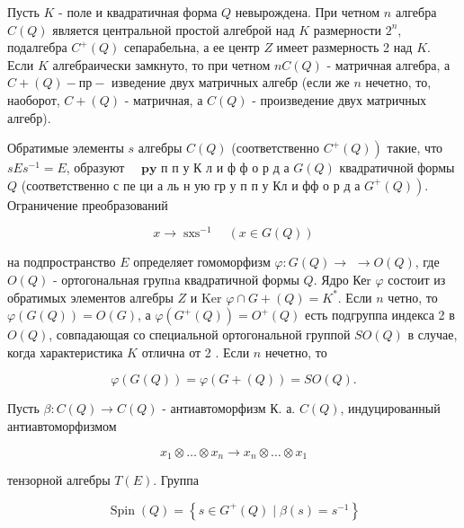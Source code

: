 \documentclass[10pt]{article}
\begin{document}
Пусть $K$ - поле и квадратичная форма $Q$ невырождена. При четном $n$ алгебра $C(Q)$ является центральной простой алгеброй над $K$ размерности $2^{n}$, подалгебра $C^{+}(Q)$ сепарабельна, а ее центр $Z$ имеет размерность 2 над $K$. Если $K$ алгебраически замкнуто, то при четном $n C(Q)$ - матричная алгебра, а $C+(Q)-п р-$ изведение двух матричных алгебр (если же $n$ нечетно, то, наоборот, $C+(Q)$ - матричная, а $C(Q)$ - произведение двух матричных алгебр).



Обратимые элементы $s$ алгебры $C(Q)$ (соответственно $\left.C^{+}(Q)\right)$ такие, что $s E s^{-1}=E$, образуют $\quad \mathbf{p} \mathbf{y}$ п п у К л и ф ф о р д а $G(Q)$ квадратичной формы $Q$ (соответственно с пе ци а ль н ую гр у п п у Кл и фф о р д а $\left.G^{+}(Q)\right)$. Ограничение преобразований



\[

x \rightarrow \operatorname{sxs}^{-1} \quad(x \in G(Q))

\]



на подпространство $E$ определяет гомоморфизм $\varphi: G(Q) \rightarrow$ $\rightarrow O(Q)$, где $O(Q)$ - ортогональная групnа квадратичной формы $Q$. Ядро Кеr $\varphi$ состоит из обратимых элементов алгебры $Z$ и Ker $\varphi \cap G+(Q)=K^{*}$. Если $n$ четно, то $\varphi(G(Q))=O(G)$, а $\varphi\left(G^{+}(Q)\right)=O^{+}(Q)$ есть подгруппа индекса 2 в $O(Q)$, совпадающая со специальной ортогональной группой $S O(Q)$ в случае, когда характеристика $K$ отлична от 2 . Если $n$ нечетно, то



\[

\varphi(G(Q))=\varphi(G+(Q))=S O(Q) .

\]



Пусть $\beta: C(Q) \rightarrow C(Q)$ - антиавтоморфизм К. а. $C(Q)$, индуцированный антиавтоморфизмом



\[

x_{1} \otimes \ldots \otimes x_{n} \rightarrow x_{n} \otimes \ldots \otimes x_{1}

\]



тензорной алгебры $T(E)$. Группа



\[

\operatorname{Spin}(Q)=\left\{s \in G^{+}(Q) \mid \beta(s)=s^{-1}\right\}

\]
\end{document}
